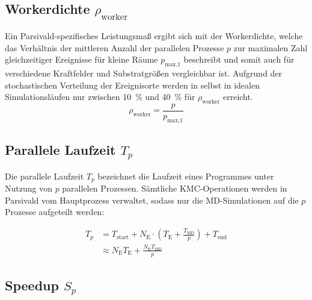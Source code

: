 \subsection{Workerdichte $\rho_\text{worker}$}

Ein Parsivald-spezifisches Leistungsmaß ergibt sich mit der Workerdichte, welche das Verhältnis der mittleren Anzahl der parallelen Prozesse $p$ zur maximalen Zahl gleichzeitiger Ereignisse für kleine Räume $p_\text{max,1}$ beschreibt und somit auch für verschiedene Kraftfelder und Substratgrößen vergleichbar ist.
Aufgrund der stochastischen Verteilung der Ereignisorte werden in selbst in idealen Simulationsläufen nur zwischen \SI{10}{\percent} und \SI{40}{\percent} für $\rho_\text{worker}$ erreicht.
\begin{equation}
  \rho_\text{worker} = \frac{p}{p_\text{max,1}}
\end{equation}

\subsection{Parallele Laufzeit $T_p$}

Die parallele Laufzeit $T_p$ bezeichnet die Laufzeit eines Programmes unter Nutzung von $p$ parallelen Prozessen.
Sämtliche KMC-Operationen werden in Parsivald vom Hauptprozess verwaltet, sodass nur die MD-Simulationen auf die $p$ Prozesse aufgeteilt werden:

\begin{align}
  T_p & = T_\text{start} + N_\text{E} \cdot (T_\text{E} + \frac{T_\text{MD}}{p}) + T_\text{end} \\
      & \approx N_\text{E} T_\text{E} + \frac{N_\text{E} T_\text{MD}}{p}
\end{align}

\subsection{Speedup $S_p$}

